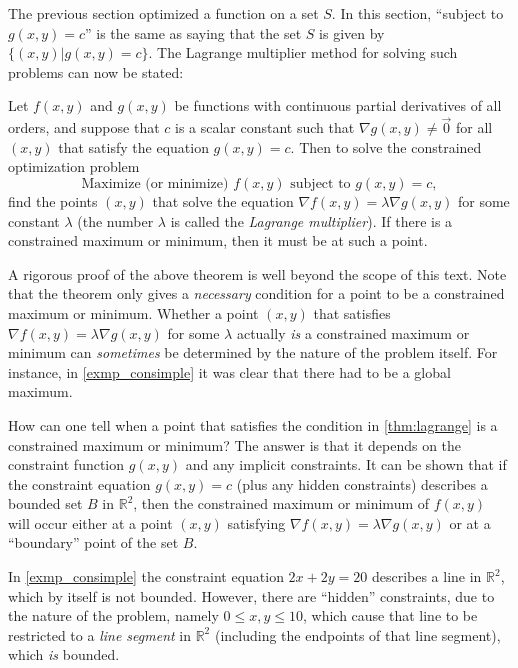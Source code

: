 The previous section optimized a function on a set $S$.  In this section, ``subject to $g(x,y)=c$'' is the same as saying that the set $S$ is given by $\{(x,y)|g(x,y)=c\}$. The Lagrange multiplier method for solving such problems can now be stated:

\begin{theorem}\label{thm:lagrange}
Let $f(x,y)$ and $g(x,y)$ be functions with continuous partial derivatives of all orders, and suppose that $c$ is a scalar constant such that $\nabla g(x,y) \ne \vec0$ for all $(x,y)$ that satisfy the equation $g(x,y) = c$. Then to solve the constrained optimization problem
\[\text{Maximize (or minimize) }f(x,y)\text{ subject to }g(x,y) = c ,\]
find the points $(x,y)$ that solve the equation $\nabla f(x,y) = \lambda \nabla g(x,y)$ for some constant $\lambda$ (the number $\lambda$ is called the \emph{Lagrange multiplier}). If there is a constrained maximum or minimum, then it must be at such a point.
\end{theorem}

A rigorous proof of the above theorem is well beyond the scope of this text.
Note that the theorem only gives a \emph{necessary} condition for a point to be a constrained maximum or minimum. Whether a point $(x,y)$ that satisfies $\nabla f(x,y) = \lambda \nabla g(x,y)$ for some $\lambda$ actually \emph{is} a constrained maximum or minimum can \emph{sometimes} be determined by the nature of the problem itself. For instance, in \autoref{exmp_consimple} it was clear that there had to be a global maximum.

How can one tell when a point that satisfies the condition in \autoref{thm:lagrange} is a constrained maximum or minimum? The answer is that it depends on the constraint function $g(x,y)$ and any implicit constraints. It can be shown
that if the constraint equation $g(x,y)=c$ (plus any hidden constraints) describes a bounded set $B$ in $\mathbb{R}^2$, then the constrained maximum or minimum of $f(x,y)$ will occur either at a point $(x,y)$ satisfying $\nabla f(x,y) = \lambda \nabla g(x,y)$ or at a ``boundary'' point of the set $B$.


In \autoref{exmp_consimple} the constraint equation $2x+2y=20$ describes a line in $\mathbb{R}^2$, which by itself is not bounded. However, there are ``hidden'' constraints, due to the nature of the problem, namely $0\le x,y \le 10$, which cause that line to be restricted to a \emph{line segment} in $\mathbb{R}^2$ (including the endpoints of that line segment), which \emph{is} bounded.

